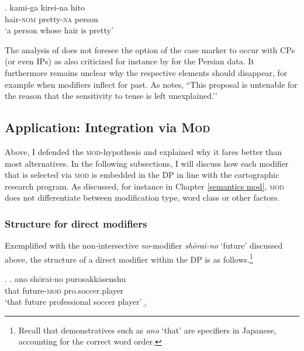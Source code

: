 \documentclass [output=book,colorlinks,citecolor=brown]{langscibook}
\begin{document}
\newpage

\exg. kami-ga kirei-na hito\\
hair-\textsc{nom} pretty-\textsc{na} person\\
`a person whose hair is pretty' \null \hfill \citep[34]{kaplan:1995:the}

The analysis of \citet{yamakido:2005:nature, larson:2008:ezafe} does not foresee the option of the case marker to occur with CPs (or even IPs) as also criticized for instance by \citet{samvelian:2008:ezafe, kahne:2014:revisiting} for the Persian data. It furthermore remains unclear why the respective elements should disappear, for example when modifiers inflect for past. As \citet[Fn. 25, p. 296]{watanabe:2013:non} notes, ``This proposal is untenable for the reason that the sensitivity to tense is left unexplained.’’

\subsection{Application: Integration via \textsc{Mod}} \label{modintegration}

Above, I defended the \textsc{mod}-hypothesis and explained why it fares better than most alternatives. In the following subsections, I will discuss how each modifier that is selected via \textsc{mod} is embedded in the DP in line with the cartographic research program. As discussed, for instance in Chapter \ref{semantics mod}, \textsc{mod} does not differentiate between modification type, word class or other factors.

\subsubsection{Structure for direct modifiers}

Exemplified with the non-intersective \textit{no}-modifier \textit{shōrai-no} `future’ discussed above, the structure of a direct modifier within the DP is as follows.\footnote{Recall that demonstratives such as \textit{ano} `that’ are specifiers in Japanese, accounting for the correct word order.} %

\ex. \label{shoraimod} \ag. ano shōrai-no purosakkāsenshu\\
that future-\textsc{mod} pro.soccer.player\\
`that future professional soccer player’
\b. 
\end{document}
